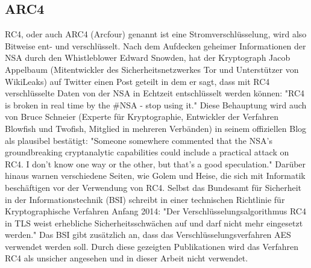\documentclass[10pt, a4paper,headsepline]{scrreprt}
\begin{document}
\subsection{ARC4}
RC4, oder auch ARC4 (Arcfour) genannt ist eine Stromverschlüsselung, wird also Bitweise ent- und verschlüsselt. %
Nach dem Aufdecken geheimer Informationen der NSA durch den Whistleblower Edward Snowden, hat der Kryptograph Jacob Appelbaum (Mitentwickler des Sicherheitsnetzwerkes Tor und Unterstützer von WikiLeaks) auf Twitter einen Post geteilt in dem er sagt, dass mit RC4 verschlüsselte Daten von der NSA in Echtzeit entschlüsselt werden können: "RC4 is broken in real time by the \#NSA - stop using it." %
Diese Behauptung wird auch von Bruce Schneier (Experte für Kryptographie, Entwickler der Verfahren Blowfish und Twofish, Mitglied in mehreren Verbänden) in seinem offiziellen Blog als plausibel bestätigt: "Someone somewhere commented that the NSA's groundbreaking cryptanalytic capabilities could include a practical attack on RC4. I don't know one way or the other, but that's a good speculation." %
Darüber hinaus warnen verschiedene Seiten, wie Golem und Heise, die sich mit Informatik beschäftigen vor der Verwendung von RC4. %
Selbst das Bundesamt für Sicherheit in der Informationstechnik (BSI) schreibt in einer technischen Richtlinie für Kryptographische Verfahren Anfang 2014: "Der Verschlüsselungsalgorithmus RC4 in TLS weist erhebliche Sicherheitsschwächen auf und darf nicht mehr eingesetzt werden." Das BSI gibt zusätzlich an, dass das Verschlüsselungsverfahren AES verwendet werden soll. %
Durch diese gezeigten Publikationen wird das Verfahren RC4 als unsicher angesehen und in dieser Arbeit nicht verwendet.
\end{document}

